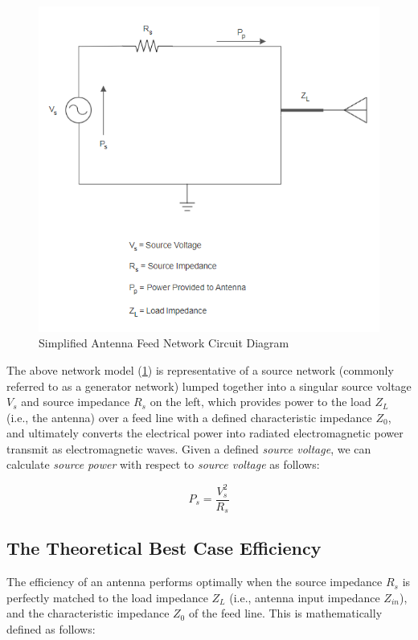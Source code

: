 \documentclass{article}
\begin{document}
\begin{figure}[h!]
    \centering
    \includegraphics[scale=0.75]{images/simpleAntennaCircuit.png}
    \caption{Simplified Antenna Feed Network Circuit Diagram}
    \label{fig:1}
\end{figure}
\newpage

The above network model (\ref{fig:1}) is representative of a source network (commonly referred to as a generator network) lumped together into a singular source voltage $V_s$ and source impedance $R_s$ on the left, which provides power to the load $Z_L$ (i.e., the antenna) over a feed line with a defined characteristic impedance $Z_0$, and ultimately converts the electrical power into radiated electromagnetic power transmit as electromagnetic waves. Given a defined \textit{source voltage}, we can calculate \textit{source power} with respect to \textit{source voltage} as follows:

\begin{equation}\label{sourcePower}
    P_s = \dfrac{V_s^2}{R_s}
\end{equation}

\subsection{The Theoretical Best Case Efficiency}
The efficiency of an antenna performs optimally when the source impedance $R_s$ is perfectly matched to the load impedance $Z_L$ (i.e., antenna input impedance $Z_{in}$), and the characteristic impedance $Z_0$ of the feed line. This is mathematically defined as follows:
\end{document}
